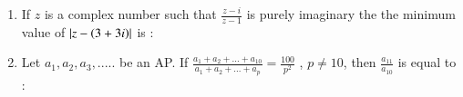 \documentclass[journal]{IEEEtran}
\begin{document}
\begin{enumerate}[start=1]
\begin{enumerate}
\end{enumerate}
\item %
If $z$ is a complex number such that $\frac{z-i}{z-1}$ is purely imaginary the the minimum value of $\left\vert z-\left(3+3i\right)\right\vert$ is :
\begin{enumerate}
\end{enumerate}
\begin{enumerate}
\end{enumerate}
\item %
Let $a_1,a_2,a_3,.....$ be an AP. If $\frac{a_1+a_2+...+a_10}{a_1+a_2+...+a_p}  = \frac{100}{p^2}$ , $p\neq 10$, then $\frac{a_11}{a_10}$ is equal to :
\begin{enumerate}
\end{enumerate}
\begin{enumerate}
\end{enumerate}
\end{enumerate}
\end{document}

